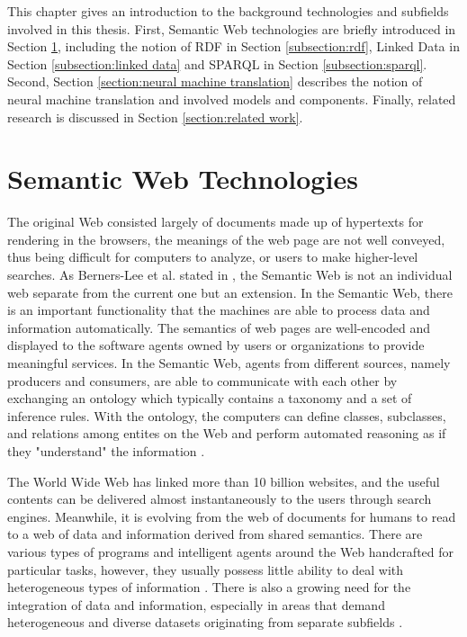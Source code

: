 
This chapter gives an introduction to the background technologies and subfields involved in this thesis. First, Semantic Web technologies are briefly introduced in Section \ref{section:semantic web technologies}, including the notion of RDF in Section \ref{subsection:rdf}, Linked Data in Section \ref{subsection:linked data} and SPARQL in Section \ref{subsection:sparql}. Second, Section \ref{section:neural machine translation} describes the notion of neural machine translation and involved models and components. Finally, related research is discussed in Section \ref{section:related work}.

\section{Semantic Web Technologies} \label{section:semantic web technologies}

The original Web consisted largely of documents made up of hypertexts for rendering in the browsers, the meanings of the web page are not well conveyed, thus being difficult for computers to analyze, or users to make higher-level searches. As Berners-Lee et al. stated in \cite{Berners-Lee2001}, the Semantic Web is not an individual web separate from the current one but an extension. In the Semantic Web, there is an important functionality that the machines are able to process data and information automatically. The semantics of web pages are well-encoded and displayed to the software agents owned by users or organizations to provide meaningful services. In the Semantic Web, agents from different sources, namely producers and consumers, are able to communicate with each other by exchanging an ontology which typically contains a taxonomy and a set of inference rules. With the ontology, the computers can define classes, subclasses, and relations among entites on the Web and perform automated reasoning as if they "understand" the information \cite{Berners-Lee2001}.

The World Wide Web has linked more than 10 billion websites, and the useful contents can be delivered almost instantaneously to the users through search engines. Meanwhile, it is evolving from the web of documents for humans to read to a web of data and information derived from shared semantics. There are various types of programs and intelligent agents around the Web handcrafted for particular tasks, however, they usually possess little ability to deal with heterogeneous types of information \cite{Shadbolt2006}. There is also a growing need for the integration of data and information, especially in areas that demand heterogeneous and diverse datasets originating from separate subfields \cite{Shadbolt2006}.

